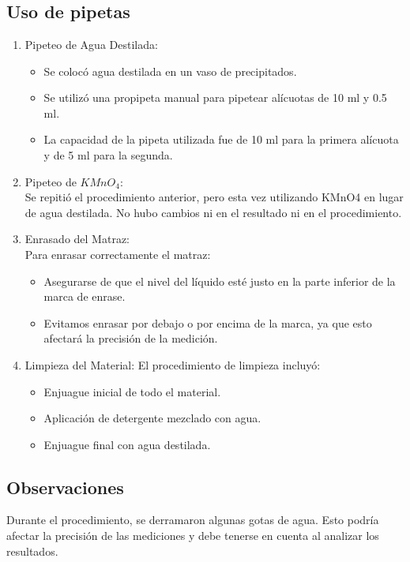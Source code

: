 \documentclass[12pt]{report}
\begin{document}
\chapter{}
\section{Uso de pipetas}

\begin{enumerate}
  \item Pipeteo de Agua Destilada:
    \begin{itemize}
      \item Se colocó agua destilada en un vaso de precipitados.
      \item Se utilizó una propipeta manual para pipetear alícuotas de 10 ml y 0.5 ml.
      \item La capacidad de la pipeta utilizada fue de 10 ml para la primera alícuota y de 5 ml para la segunda.
    \end{itemize}
  \item Pipeteo de $KMnO_4$:
\\Se repitió el procedimiento anterior, pero esta vez utilizando KMnO4 en lugar de agua destilada. No hubo cambios ni en el resultado ni en el procedimiento.
  \item Enrasado del Matraz:
\\Para enrasar correctamente el matraz:
    \begin{itemize}
      \item Asegurarse de que el nivel del líquido esté justo en la parte inferior de la marca de enrase.
      \item Evitamos enrasar por debajo o por encima de la marca, ya que esto afectará la precisión de la medición.
    \end{itemize}
  \item Limpieza del Material:
El procedimiento de limpieza incluyó:
    \begin{itemize}
      \item Enjuague inicial de todo el material.
      \item Aplicación de detergente mezclado con agua.
      \item Enjuague final con agua destilada.
    \end{itemize}
\end{enumerate}

\section*{Observaciones}
Durante el procedimiento, se derramaron algunas gotas de agua. Esto podría afectar la precisión de las mediciones y debe tenerse en cuenta al analizar los resultados.
\end{document}
